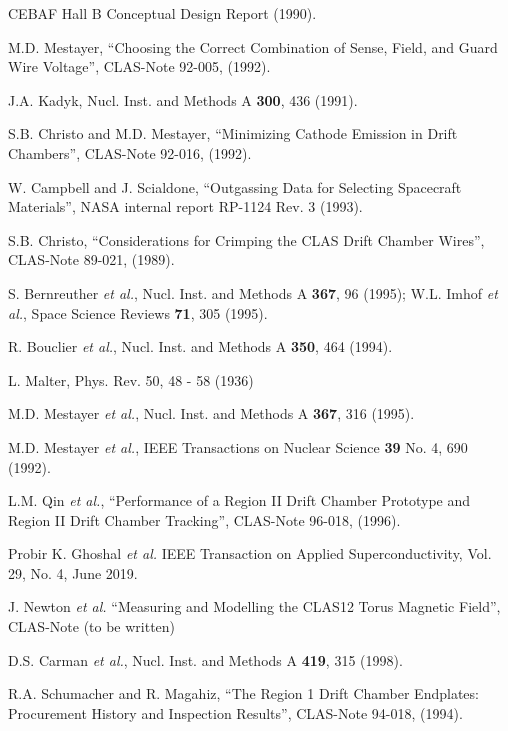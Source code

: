 \begin{thebibliography}{99}

CEBAF Hall B Conceptual Design Report (1990).

 M.D. Mestayer, ``Choosing the Correct 
Combination of Sense, Field, and Guard Wire Voltage'', CLAS-Note 
92-005, (1992).

J.A. Kadyk, Nucl. Inst. and Methods A {\bf 300}, 436 (1991).

S.B. Christo and M.D. Mestayer, ``Minimizing Cathode Emission in Drift 
Chambers'', CLAS-Note 92-016, (1992).

 W. Campbell and J. Scialdone, ``Outgassing Data for 
Selecting Spacecraft Materials'', NASA internal report RP-1124 Rev. 3 (1993).

 S.B. Christo, ``Considerations for Crimping the
CLAS Drift Chamber Wires'', CLAS-Note 89-021, (1989).

 S. Bernreuther {\it et al.}, Nucl. Inst. and Methods A {\bf 367}, 
96 (1995); W.L. Imhof {\it et al.}, Space Science Reviews {\bf 71}, 305 (1995).

 R. Bouclier {\it et al.}, Nucl. Inst. and Methods A {\bf 350}, 
464 (1994).

 L. Malter, Phys. Rev. 50, 48 - 58 (1936)

M.D. Mestayer {\it et al.}, Nucl. Inst. and Methods A {\bf 367}, 316 (1995).

 M.D. Mestayer {\it et al.}, IEEE Transactions on Nuclear 
Science {\bf 39} No. 4, 690 (1992).

 L.M. Qin {\it et al.}, ``Performance of a Region II Drift Chamber Prototype and Region II Drift Chamber Tracking'', CLAS-Note 96-018, (1996).

 Probir K. Ghoshal {\it et al.} IEEE Transaction on Applied Superconductivity, Vol. 29, No. 4, June 2019.

J. Newton {\it et al.} ``Measuring and Modelling the CLAS12 Torus Magnetic Field'', CLAS-Note (to be written)

D.S. Carman {\it et al.}, Nucl. Inst. and Methods A {\bf 419}, 315 (1998).

R.A. Schumacher and R. Magahiz, ``The Region 1 Drift Chamber 
Endplates: Procurement History and Inspection Results'', CLAS-Note 
94-018, (1994).


\end{thebibliography}
